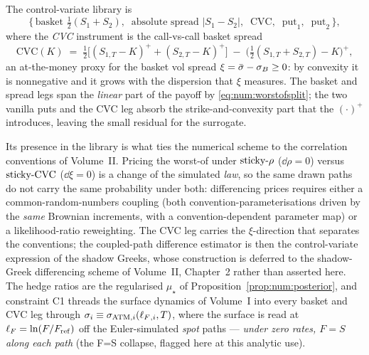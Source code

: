 The control-variate library is
\[
   \{\,\text{basket } \tfrac12(S_1+S_2),\;\;
        \text{absolute spread } |S_1-S_2|,\;\;
        \text{CVC},\;\;
        \text{put}_1,\;\; \text{put}_2 \,\},
\]
where the \emph{CVC} instrument is the call-vs-call basket spread
\begin{equation}\label{eq:num:cvc}
   \mathrm{CVC}(K) \;=\;
   \tfrac12\bigl[(S_{1,T}-K)^+ + (S_{2,T}-K)^+\bigr]
   \;-\; \bigl(\tfrac12(S_{1,T}+S_{2,T}) - K\bigr)^+ ,
\end{equation}
an at-the-money proxy for the basket vol spread $\xi = \bar\sigma - \sigma_B \ge 0$: by
convexity it is nonnegative and it grows with the dispersion that $\xi$ measures.
The basket and spread legs span the \emph{linear} part of the payoff by
\eqref{eq:num:worstofsplit}; the two vanilla puts and the CVC leg absorb the
strike-and-convexity part that the $(\cdot)^+$ introduces, leaving the small
residual for the surrogate.

Its presence in the library is what ties the numerical scheme to the correlation
conventions of Volume~II. Pricing the worst-of under $\textnormal{sticky-}\rho$
($\dd\rho = 0$) versus $\textnormal{sticky-CVC}$ ($\dd\xi = 0$) is a change of the simulated
\emph{law}, so the same drawn paths do not carry the same probability under both:
differencing prices requires either a common-random-numbers coupling (both
convention-parameterisations driven by the \emph{same} Brownian increments, with a
convention-dependent parameter map) or a likelihood-ratio reweighting. The CVC leg
carries the $\xi$-direction that separates the conventions; the coupled-path
difference estimator is then the control-variate expression of the shadow Greeks,
whose construction is deferred to the shadow-Greek differencing scheme of Volume~II,
Chapter~2 rather than asserted here. The hedge ratios are the regularised
$\mu_\star$ of Proposition~\ref{prop:num:posterior}, and constraint C1 threads the
surface dynamics of Volume~I into every basket and CVC leg through
$\sigma_i \equiv \sigma_{\mathrm{ATM},i}(\ell_F{}_{,i}, T)$, where the surface is read at
$\ell_F = \ln(F/F_{\mathrm{ref}})$ off the Euler-simulated \emph{spot} paths --- \emph{under
zero rates, $F = S$ along each path} (the F=S collapse, flagged here at this
analytic use).

